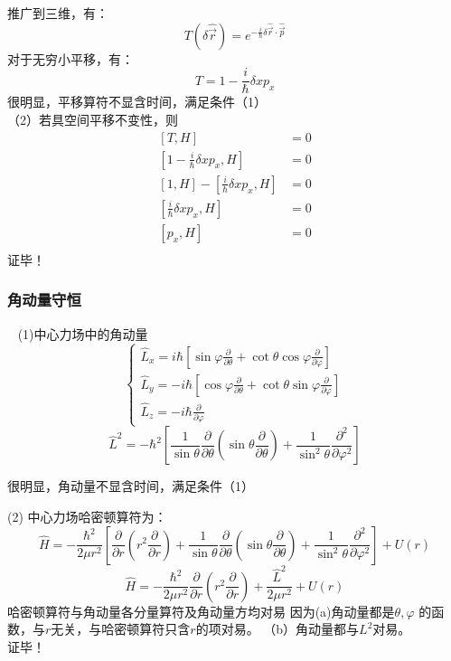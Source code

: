 \begin{frame}    
    推广到三维，有：
    $$ T(\delta \hat{\vec{r}})= e^{-\frac{i}{\hbar}\delta \hat{\vec{r}}\cdot \hat{\vec{p}} }  $$ 
    对于无穷小平移，有：
    $$T=1-\frac{i}{\hbar}\delta x p_x$$
    很明显，平移算符不显含时间，满足条件（1）\\
    （2）若具空间平移不变性，则
    $$\begin{aligned}
        [T,H]&= 0 \\
        [1-\frac{i}{\hbar}\delta x p_x, H] &=0 \\
        [1, H]-[\frac{i}{\hbar}\delta x p_x, H]&=0 \\
        [\frac{i}{\hbar}\delta x p_x, H]&=0 \\
        [p_x, H] &=0 \\
    \end{aligned}$$
    证毕！
\end{frame}

\begin{frame}
    \frametitle{角动量守恒} 
    \例[24.试证明在中心力场中运动粒子的角动量是守恒量]{}                                
    \证~ (1)中心力场中的角动量
    $$
    \left\{\begin{array}{l}
        \hat{L}_{x}=i \hbar\left[\sin \varphi \frac{\partial}{\partial \theta}+\cot \theta \cos \varphi \frac{\partial}{\partial \varphi}\right] \\
        \hat{L}_{y}=-i \hbar\left[\cos \varphi \frac{\partial}{\partial \theta}+\cot \theta \sin \varphi \frac{\partial}{\partial \varphi}\right] \\
        \hat{L}_{z}=-i \hbar \frac{\partial}{\partial \varphi}
        \end{array}\right.
    $$
    $$ \hat{L}^{2}=-\hbar^{2}\left[\frac{1}{\sin \theta} \frac{\partial}{\partial \theta}\left(\sin \theta \frac{\partial}{\partial \theta}\right)+\frac{1}{\sin ^{2} \theta} \frac{\partial^{2}}{\partial \varphi^{2}}\right] $$
    
    很明显，角动量不显含时间，满足条件（1）\\
\end{frame}

\begin{frame} 
    (2) 中心力场哈密顿算符为： 
    $$
    \hat{H}=-\frac{\hbar^{2}}{2 \mu r^{2}}\left[\frac{\partial}{\partial r}\left(r^{2} \frac{\partial}{\partial r}\right)+\frac{1}{\sin \theta} \frac{\partial}{\partial \theta}\left(\sin \theta \frac{\partial}{\partial \theta}\right)+\frac{1}{\sin ^{2} \theta} \frac{\partial^{2}}{\partial \varphi^{2}}\right]+U(r)
    $$
    $$
    \hat{H}=-\frac{\hbar^{2}}{2 \mu r^{2}} \frac{\partial}{\partial r}\left(r^{2} \frac{\partial}{\partial r}\right)+\frac{\hat{L}^{2}}{2 \mu r^{2}}+U(r)
    $$
    哈密顿算符与角动量各分量算符及角动量方均对易 因为(a)角动量都是$\theta, \varphi$ 的函数，与$r$无关，与哈密顿算符只含$r$的项对易。
    （b）角动量都与$L^2$对易。\\
    证毕！
\end{frame}

